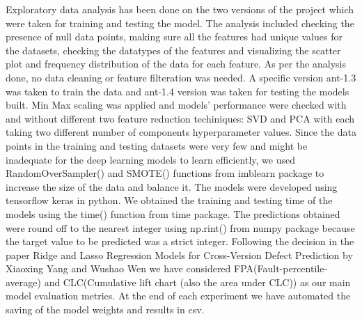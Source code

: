 Exploratory data analysis has been done on the two versions of the project which were taken for training and testing the model. The analysis included checking the presence of null data points, making sure all the features had unique values for the datasets, checking the datatypes of the features and visualizing the scatter plot and frequency distribution of the data for each feature. As per the analysis done, no data cleaning or feature filteration was needed. A specific version ant-1.3 was taken to train the data and ant-1.4 version was taken for testing the models built. Min Max scaling was applied and models' performance were checked with and without different two feature reduction techiniques: SVD and PCA with each taking two different number of components hyperparameter values. Since the data points in the training and testing datasets were very few and might be inadequate for the deep learning models to learn efficiently, we used RandomOverSampler() and SMOTE() functions from imblearn package to increase the size of the data and balance it. The models were developed using tensorflow keras in python. We obtained the training and testing time of the models using the time() function from time package. The predictions obtained were round off to the nearest integer using np.rint() from numpy package because the target value to be predicted was a strict integer. Following the decision in the paper Ridge and Lasso Regression Models for Cross-Version Defect Prediction by Xiaoxing Yang and Wushao Wen we have considered FPA(Fault-percentile-average) and CLC(Cumulative lift chart (also the area under CLC)) as our main model evaluation metrics. At the end of each experiment we have automated the saving of the model weights and results in csv. 